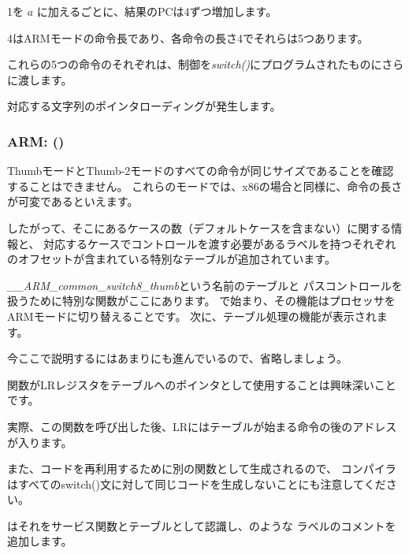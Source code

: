 1を $a$ に加えるごとに、結果の\ac{PC}は4ずつ増加します。

4はARMモードの命令長であり、各命令の長さ4でそれらは5つあります。

これらの5つの命令のそれぞれは、制御を\emph{switch()}にプログラムされたものにさらに渡します。

対応する文字列のポインタローディングが発生します。

\subsubsection{ARM: \OptimizingKeilVI (\ThumbMode)}




ThumbモードとThumb-2モードのすべての命令が同じサイズであることを確認することはできません。
これらのモードでは、x86の場合と同様に、命令の長さが可変であるといえます。


したがって、そこにあるケースの数（デフォルトケースを含まない）に関する情報と、
対応するケースでコントロールを渡す必要があるラベルを持つそれぞれのオフセットが含まれている特別なテーブルが追加されています。


\emph{\_\_ARM\_common\_switch8\_thumb}という名前のテーブルと
パスコントロールを扱うために特別な関数がここにあります。
で始まり、その機能はプロセッサをARMモードに切り替えることです。
次に、テーブル処理の機能が表示されます。

今ここで説明するにはあまりにも進んでいるので、省略しましょう。


関数が\ac{LR}レジスタをテーブルへのポインタとして使用することは興味深いことです。

実際、この関数を呼び出した後、\ac{LR}にはテーブルが始まる命令の後のアドレスが入ります。

また、コードを再利用するために別の関数として生成されるので、
コンパイラはすべてのswitch()文に対して同じコードを生成しないことにも注意してください。

\IDA はそれをサービス関数とテーブルとして認識し、のような
ラベルのコメントを追加します。
